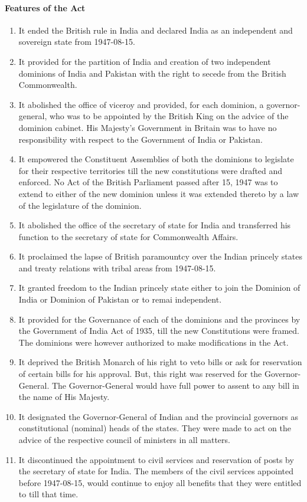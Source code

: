 \paragraph{Features of the Act}
\begin{enumerate}
  \item It ended the British rule in India and declared India as an independent and sovereign state from 1947-08-15.
  \item It provided for the partition of India and creation of two independent dominions of India and Pakistan with the right to secede from the British Commonwealth.
  \item It abolished the office of viceroy and provided, for each dominion, a governor-general, who was to be appointed by the British King on the advice of the dominion cabinet. His Majesty's Government in Britain was to have no responsibility with respect to the Government of India or Pakistan.
  \item It empowered the Constituent Assemblies of both the dominions to legislate for their respective territories till the new constitutions were drafted and enforced. No Act of the British Parliament passed after 15, 1947 was to extend to either of the new dominion unless it was extended thereto by a law of the legislature of the dominion.
  \item It abolished the office of the secretary of state for India and transferred his function to the secretary of state for Commonwealth Affairs.
  \item It proclaimed the lapse of British paramountcy over the Indian princely states and treaty relations with tribal areas from 1947-08-15.
  \item It granted freedom to the Indian princely state either to join the Dominion of India or Dominion of Pakistan or to remai independent.
  \item It provided for the Governance of each of the dominions and the provinces by the Government of India Act of 1935, till the new Constitutions were framed. The dominions were however authorized to make modifications in the Act.
  \item It deprived the British Monarch of his right to veto bills or ask for reservation of certain bills for his approval. But, this right was reserved for the Governor-General. The Governor-General would have full power to assent to any bill in the name of His Majesty.
  \item It designated the Governor-General of Indian and the provincial governors as constitutional (nominal) heads of the states. They were made to act on the advice of the respective council of ministers in all matters.
  \item It discontinued the appointment to civil services and reservation of posts by the secretary of state for India. The members of the civil services appointed before 1947-08-15, would continue to enjoy all benefits that they were entitled to till that time.
\end{enumerate}

